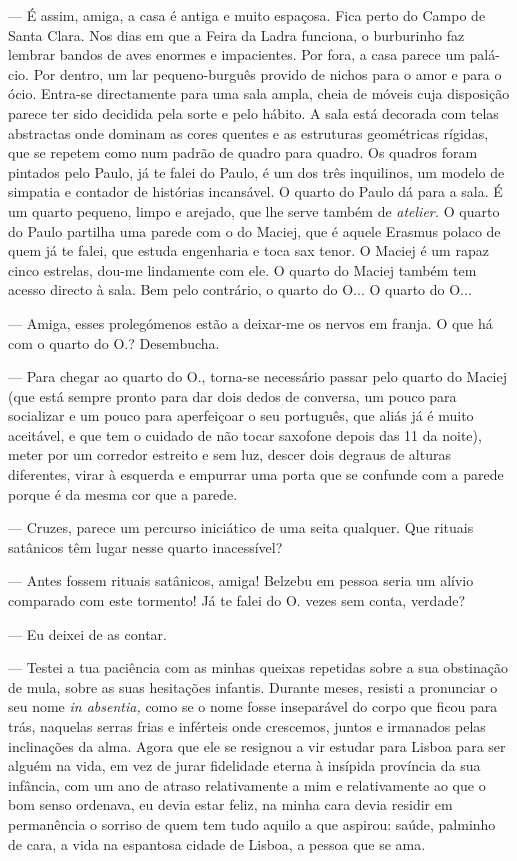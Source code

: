 --- É assim, amiga, a casa é antiga e muito espaçosa. Fica perto do Campo de
Santa Clara. Nos dias em que a
Feira da Ladra funciona, o burburinho faz lembrar bandos de aves enormes
e impacientes. Por fora, a casa parece um palá- cio. Por dentro, um lar
pequeno-burguês provido de nichos para o amor e para o ócio. Entra-se
directamente para uma sala ampla, cheia de móveis cuja disposição parece
ter sido decidida pela sorte e pelo hábito. A sala está decorada com
telas abstractas onde dominam as cores quentes e as estruturas geométricas rígidas, que se repetem como num padrão de quadro para quadro.
Os quadros foram pintados pelo Paulo, já te falei do Paulo, é um dos
três inquilinos, um modelo de simpatia e contador de histórias
incansável. O quarto do Paulo dá para a sala. É um quarto pequeno, limpo
e arejado, que lhe serve também de \emph{atelier. }O quarto do Paulo
partilha uma parede com o do Maciej, que é aquele Erasmus polaco de quem
já te falei, que estuda engenharia e toca sax tenor. O Maciej é um rapaz
cinco estrelas, dou-me lindamente com ele. O quarto do Maciej também tem
acesso directo à sala. Bem pelo contrário, o quarto do O... O quarto do
O...

--- Amiga, esses prolegómenos estão a deixar-me os nervos em franja. O que
  há com o quarto do O.? Desembucha.

--- Para chegar ao quarto do O., torna-se necessário passar pelo quarto do
  Maciej (que está sempre pronto para dar dois dedos de conversa, um
  pouco para socializar e um pouco para aperfeiçoar o seu português, que
  aliás já é muito aceitável, e que tem o cuidado de não tocar saxofone
  depois das 11 da noite), meter por um corredor estreito e sem luz,
  descer dois degraus de alturas diferentes, virar à esquerda e empurrar
  uma porta que se confunde com a parede porque é da mesma cor que a
  parede.

--- Cruzes, parece um percurso iniciático de uma seita qualquer. Que
  rituais satânicos têm lugar nesse quarto inacessível?

--- Antes fossem rituais satânicos, amiga! Belzebu em pessoa seria um
  alívio comparado com este tormento! Já te falei do O. vezes sem conta,
  verdade?

--- Eu deixei de as contar.

--- Testei a tua paciência com as minhas queixas repetidas sobre a sua
  obstinação de mula, sobre as suas hesitações infantis. Durante meses,
  resisti a pronunciar o seu nome \emph{in absentia, }como se o nome
  fosse inseparável do corpo que ficou para trás, naquelas serras
  frias e inférteis onde crescemos, juntos e irmanados pelas inclinações
  da alma. Agora que ele se resignou a vir estudar para Lisboa para ser
  alguém na vida, em vez de jurar fidelidade eterna à insípida província
  da sua infância, com um ano de atraso relativamente a mim e relativamente ao que o bom senso ordenava, eu devia estar feliz, na minha
  cara devia residir em permanência o sorriso de quem tem tudo aquilo a
  que aspirou: saúde, palminho de cara, a vida na espantosa cidade de
  Lisboa, a pessoa que se ama.



